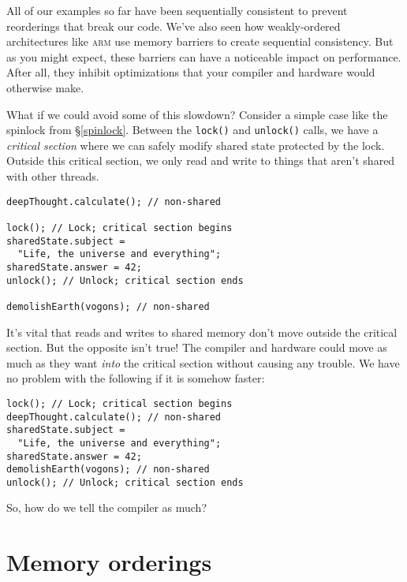 \documentclass[fontsize=\bodyfontsize, numbers=endperiod]{scrartcl}
\newcommand{\codesize}{\fontsize{\bodyfontsize}{\bodybaselineskip}}
\newcommand{\introduce}[1]{\textit{#1}}
\newcommand{\secref}[1]{\hyperref[#1]{\textsc{\S}\ref*{#1}}}
\newenvironment{colfigure}
  {\par\vspace{1\baselineskip minus 0.5\baselineskip}\noindent\minipage{\linewidth}}
  {\endminipage\vspace{1\baselineskip minus 0.7\baselineskip}}
\begin{document}
\begin{multicols}{2}
All of our examples so far have been sequentially consistent to prevent
reorderings that break our code.
We've also seen how weakly-ordered architectures like \textsc{arm}
use memory barriers to create sequential consistency.
But as you might expect,
these barriers can have a noticeable impact on performance.
After all,
they inhibit optimizations that your compiler and hardware would otherwise make.

What if we could avoid some of this slowdown?
Consider a simple case like the spinlock from \secref{spinlock}.
Between the \texttt{lock()} and \texttt{unlock()} calls,
we have a \introduce{critical section}
where we can safely modify shared state protected by the lock.
Outside this critical section,
we only read and write to things that aren't
shared with other threads.
\begin{colfigure}
\begin{verbatim}
deepThought.calculate(); // non-shared

lock(); // Lock; critical section begins
sharedState.subject =
  "Life, the universe and everything";
sharedState.answer = 42;
unlock(); // Unlock; critical section ends

demolishEarth(vogons); // non-shared
\end{verbatim}
\end{colfigure}

It's vital that reads and writes to shared memory
don't move outside the critical section.
But the opposite isn't true!
The compiler and hardware could move as much as they want \emph{into}
the critical section without causing any trouble.
We have no problem with the following if it is somehow faster:
\begin{colfigure}
\begin{verbatim}
lock(); // Lock; critical section begins
deepThought.calculate(); // non-shared
sharedState.subject =
  "Life, the universe and everything";
sharedState.answer = 42;
demolishEarth(vogons); // non-shared
unlock(); // Unlock; critical section ends
\end{verbatim}
\end{colfigure}
So, how do we tell the compiler as much?

\section{Memory orderings}


\end{multicols}
\end{document}
